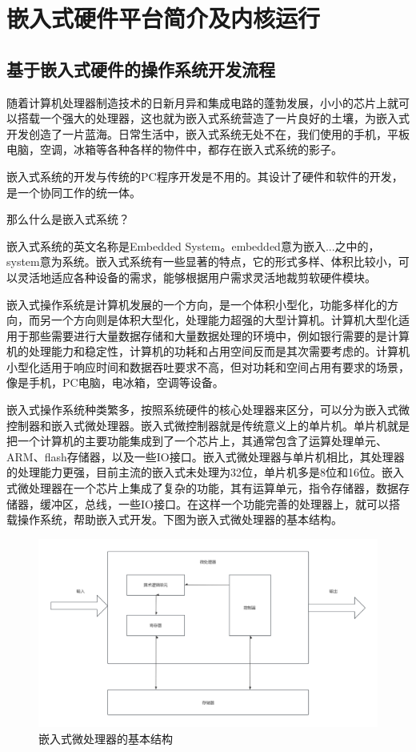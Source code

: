 \chapter{嵌入式硬件平台简介及内核运行}
\section{基于嵌入式硬件的操作系统开发流程}
随着计算机处理器制造技术的日新月异和集成电路的蓬勃发展，小小的芯片上就可以搭载一个强大的处理器，这也就为嵌入式系统营造了一片良好的土壤，为嵌入式开发创造了一片蓝海。日常生活中，嵌入式系统无处不在，我们使用的手机，平板电脑，空调，冰箱等各种各样的物件中，都存在嵌入式系统的影子。

嵌入式系统的开发与传统的PC程序开发是不用的。其设计了硬件和软件的开发，是一个协同工作的统一体。

那么什么是嵌入式系统？

嵌入式系统的英文名称是Embedded System。embedded意为嵌入...之中的，system意为系统。嵌入式系统有一些显著的特点，它的形式多样、体积比较小，可以灵活地适应各种设备的需求，能够根据用户需求灵活地裁剪软硬件模块。

嵌入式操作系统是计算机发展的一个方向，是一个体积小型化，功能多样化的方向，而另一个方向则是体积大型化，处理能力超强的大型计算机。计算机大型化适用于那些需要进行大量数据存储和大量数据处理的环境中，例如银行需要的是计算机的处理能力和稳定性，计算机的功耗和占用空间反而是其次需要考虑的。计算机小型化适用于响应时间和数据吞吐要求不高，但对功耗和空间占用有要求的场景，像是手机，PC电脑，电冰箱，空调等设备。

嵌入式操作系统种类繁多，按照系统硬件的核心处理器来区分，可以分为嵌入式微控制器和嵌入式微处理器。嵌入式微控制器就是传统意义上的单片机。单片机就是把一个计算机的主要功能集成到了一个芯片上，其通常包含了运算处理单元、ARM、flash存储器，以及一些IO接口。嵌入式微处理器与单片机相比，其处理器的处理能力更强，目前主流的嵌入式未处理为32位，单片机多是8位和16位。嵌入式微处理器在一个芯片上集成了复杂的功能，其有运算单元，指令存储器，数据存储器，缓冲区，总线，一些IO接口。在这样一个功能完善的处理器上，就可以搭载操作系统，帮助嵌入式开发。下图为嵌入式微处理器的基本结构。

\begin{figure}[H]
	\centering
	\includegraphics{figures/08-01-嵌入式微处理器基本结构.png}
	\caption{嵌入式微处理器的基本结构}
\end{figure}

